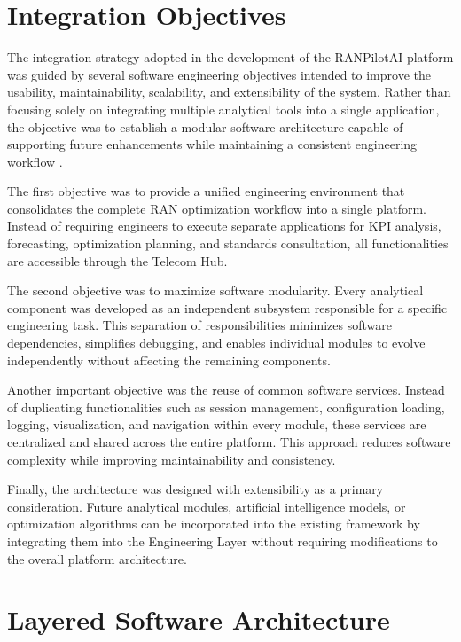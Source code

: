\section{Integration Objectives}

The integration strategy adopted in the development of the RANPilotAI platform was guided by several software engineering objectives intended to improve the usability, maintainability, scalability, and extensibility of the system. Rather than focusing solely on integrating multiple analytical tools into a single application, the objective was to establish a modular software architecture capable of supporting future enhancements while maintaining a consistent engineering workflow \cite{bass2021}.

The first objective was to provide a unified engineering environment that consolidates the complete RAN optimization workflow into a single platform. Instead of requiring engineers to execute separate applications for KPI analysis, forecasting, optimization planning, and standards consultation, all functionalities are accessible through the Telecom Hub.

The second objective was to maximize software modularity. Every analytical component was developed as an independent subsystem responsible for a specific engineering task. This separation of responsibilities minimizes software dependencies, simplifies debugging, and enables individual modules to evolve independently without affecting the remaining components.

Another important objective was the reuse of common software services. Instead of duplicating functionalities such as session management, configuration loading, logging, visualization, and navigation within every module, these services are centralized and shared across the entire platform. This approach reduces software complexity while improving maintainability and consistency.

Finally, the architecture was designed with extensibility as a primary consideration. Future analytical modules, artificial intelligence models, or optimization algorithms can be incorporated into the existing framework by integrating them into the Engineering Layer without requiring modifications to the overall platform architecture.

\section{Layered Software Architecture}

